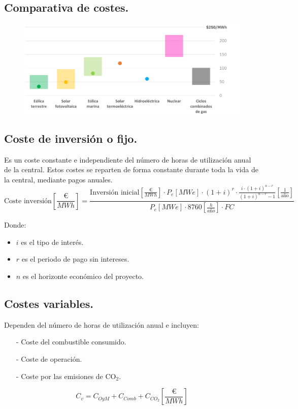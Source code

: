 \subsection{Comparativa de costes.}
\begin{figure}[H]
	\centering
	\includegraphics[width=0.7\linewidth]{res/tema4/lcoe}
	\label{fig:lcoe}
\end{figure}

\subsection{Coste de inversión o fijo.}
Es un coste constante e independiente del número de horas de utilización anual de la central.  Estos costes se reparten de forma constante durante toda la vida de la central, mediante pagos
anuales.
\[\text{Coste inversión} \left[\frac{\euro}{MWh}\right]=
\frac{
	\text{Inversión inicial}\left[\frac{\euro}{MWh}\right] \cdot P_e [MWe]\cdot(1+i)^r\cdot\frac{i\cdot(1+i)^{n-r}}{(1+i)^{n-r}-1}[\frac{1}{\text{año}}]
	}{P_e [MWe]\cdot8760\left[\frac{h}{año}\right]\cdot FC }\]
	
Donde:
\begin{itemize}
	\item $i$ es el tipo de interés.
	\item $r$ es el periodo de pago sin intereses.
	\item $n$ es el horizonte económico del proyecto.
\end{itemize}
\subsection{Costes variables.}
Dependen del número de horas de utilización anual e incluyen:
\begin{itemize}
	\item [-] Coste del combustible consumido.
	\item [-] Coste de operación.
	\item [-] Coste por las emisiones de CO$_2$.
\end{itemize}
\[C_v=C_{OyM}+C_{Comb}+C_{CO_2} \left[\frac{\euro}{MWh}\right]\]
